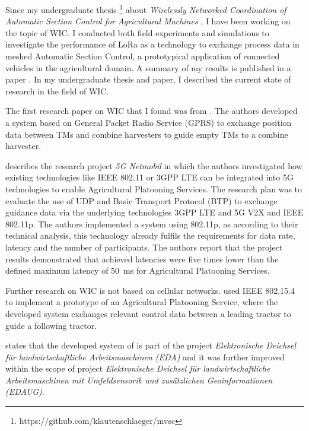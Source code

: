 

Since my undergraduate thesis \footnote{https://github.com/klautenschlaeger/mvsc} about \textit{
Wirelessly Networked Coordination of Automatic Section Control for Agricultural Machines}
, I have been working on the topic of \ac{WIC}. I conducted both field experiments and
simulations to investigate the performance of LoRa as a technology to exchange process data in
meshed Automatic Section Control, a prototypical application of connected vehicles in the agricultural domain.
A summary of my results is published in a paper \cite{lautenschlaeger_beyond_2022}.
In my undergraduate thesis and paper, I described the current state of research in the field of WIC.

The first research paper on WIC that I found was from \textcite{ali_multi-agent_2010}. The authors
developed a system based on General Packet Radio Service (GPRS) to exchange position data between \ac{TM}s and combine
harvesters to guide empty \ac{TM}s to a combine harvester.

\textcite{smolnik_5g_2020} describes the research project \textit{5G Netmobil} in which the authors investigated how existing technologies like
IEEE 802.11 or 3GPP LTE can be integrated into 5G technologies to enable Agricultural Platooning Services. The research plan was to evaluate the use of \ac{UDP} and Basic Transport Protocol (BTP) to exchange guidance data via
the underlying technologies 3GPP LTE and 5G V2X and IEEE 802.11p. The authors implemented a system using 802.11p,
as according to their technical analysis, this technology already fulfils the requirements for data rate, latency
and the number of participants. The authors report that the project results demonstrated that achieved
latencies were five times lower than the defined maximum latency of \SI{50}{\milli\second} for Agricultural Platooning Services.

Further research on \ac{WIC} is not based on cellular networks. \textcite{zhang_method_2009} used IEEE 802.15.4 to implement a
prototype of an Agricultural Platooning Service, where the developed system exchanges relevant control data between a leading tractor
to guide a following tractor.

\textcite{smolnik_5g_2020} states that the developed system of \textcite{zhang_method_2009} is part
of the project \textit{Elektronische Deichsel für landwirtschaftliche Arbeitsmaschinen (EDA)}
and it was further improved within the scope of project \textit{Elektronische Deichsel für landwirtschaftliche Arbeitsmaschinen mit Umfeldsensorik und zusätzlichen Geoinformationen (EDAUG)}.



